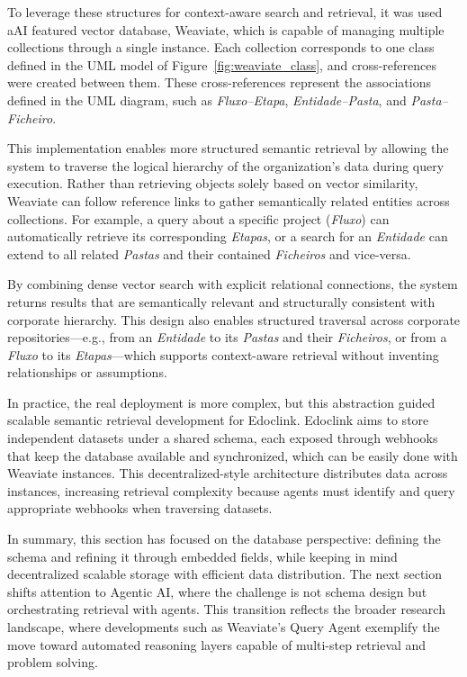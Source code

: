 To leverage these structures for context-aware search and retrieval, it was used a\gls{AI} featured vector database, Weaviate, which is capable of managing multiple collections through a single instance. Each collection corresponds to one class defined in the UML model of Figure~\ref{fig:weaviate_class}, and cross-references were created between them. These cross-references represent the associations defined in the UML diagram, such as \textit{Fluxo--Etapa}, \textit{Entidade--Pasta}, and \textit{Pasta--Ficheiro}.

This implementation enables more structured semantic retrieval by allowing the system to traverse the logical hierarchy of the organization’s data during query execution. Rather than retrieving objects solely based on vector similarity, Weaviate can follow reference links to gather semantically related entities across collections. For example, a query about a specific project (\textit{Fluxo}) can automatically retrieve its corresponding \textit{Etapas}, or a search for an \textit{Entidade} can extend to all related \textit{Pastas} and their contained \textit{Ficheiros} and vice-versa.

By combining dense vector search with explicit relational connections, the system returns results that are semantically relevant and structurally consistent with corporate hierarchy. This design also enables structured traversal across corporate repositories—e.g., from an \textit{Entidade} to its \textit{Pastas} and their \textit{Ficheiros}, or from a \textit{Fluxo} to its \textit{Etapas}—which supports context-aware retrieval without inventing relationships or assumptions.

In practice, the real deployment is more complex, but this abstraction guided scalable semantic retrieval development for Edoclink.
Edoclink aims to store independent datasets under a shared schema, each exposed through webhooks that keep the database available and synchronized, which can be easily done with Weaviate instances. This decentralized-style architecture distributes data across instances, increasing retrieval complexity because agents must identify and query appropriate webhooks when traversing datasets.

In summary, this section has focused on the database perspective: defining the schema and refining it through embedded fields, while keeping in mind decentralized scalable storage with efficient data distribution. The next section shifts attention to Agentic AI, where the challenge is not schema design but orchestrating retrieval with agents. This transition reflects the broader research landscape, where developments such as Weaviate's Query Agent \cite{weaviate} exemplify the move toward automated reasoning layers capable of multi-step retrieval and problem solving. 

